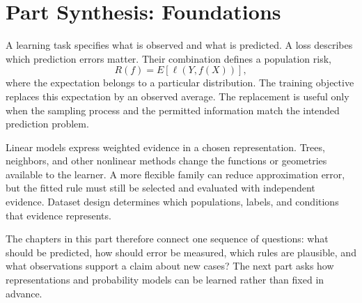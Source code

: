 \chapter*{Part Synthesis: Foundations}

A learning task specifies what is observed and what is predicted. A loss describes which prediction errors matter. Their combination defines a population risk,
\[
R(f)=E[\ell(Y,f(X))],
\]
where the expectation belongs to a particular distribution. The training objective replaces this expectation by an observed average. The replacement is useful only when the sampling process and the permitted information match the intended prediction problem.

Linear models express weighted evidence in a chosen representation. Trees, neighbors, and other nonlinear methods change the functions or geometries available to the learner. A more flexible family can reduce approximation error, but the fitted rule must still be selected and evaluated with independent evidence. Dataset design determines which populations, labels, and conditions that evidence represents.

The chapters in this part therefore connect one sequence of questions: what should be predicted, how should error be measured, which rules are plausible, and what observations support a claim about new cases? The next part asks how representations and probability models can be learned rather than fixed in advance.

\clearpage
\begingroup\pagestyle{empty}\cleardoublepage\endgroup
